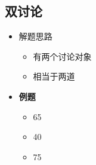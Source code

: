   \subsection{双讨论}

    \begin{itemize}
      \item 解题思路
      \begin{itemize}
        \item 有两个讨论对象
        \item 相当于两道
      \end{itemize}

      \item \textbf{例题}
      \begin{itemize}
        \item 65
        \item 40
        \item 75
      \end{itemize}
    \end{itemize}

